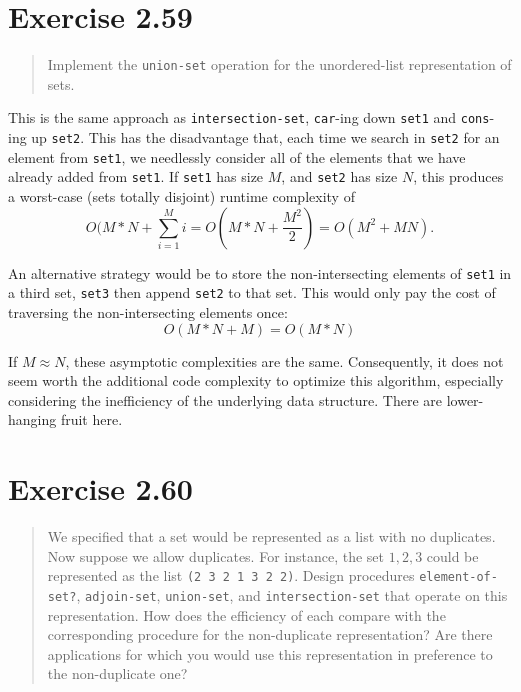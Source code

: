 \documentclass{article}
\begin{document}
\section{Exercise 2.59}
\begin{quote}
    Implement the \texttt{union-set} operation for the unordered-list
    representation of sets.
\end{quote}



This is the same approach as \texttt{intersection-set}, \texttt{car}-ing down
\texttt{set1} and \texttt{cons}-ing up \texttt{set2}. This has the disadvantage
that, each time we search in \texttt{set2} for an element from \texttt{set1},
we needlessly consider all of the elements that we have already added from
\texttt{set1}. If \texttt{set1} has size $M$, and \texttt{set2} has size $N$,
this produces a worst-case (sets totally disjoint) runtime complexity of
\begin{equation*}
    O(M * N + \sum_{i=1}^{M}i = O(M * N + \frac{M^2}{2}) = O(M^2 + MN).
\end{equation*}

An alternative strategy would be to store the non-intersecting elements of
\texttt{set1} in a third set, \texttt{set3} then append \texttt{set2} to that
set. This would only pay the cost of traversing the non-intersecting elements
once:
\begin{equation*}
    O(M * N + M) = O(M *N)
\end{equation*}

If $M \approx N$, these asymptotic complexities are the same. Consequently, it
does not seem worth the additional code complexity to optimize this algorithm,
especially considering the inefficiency of the underlying data structure. There
are lower-hanging fruit here.

\section{Exercise 2.60}
\begin{quote}
    We specified that a set would be represented as a list with no duplicates.
    Now suppose we allow duplicates. For instance, the set ${1,2,3}$ could
    be represented as the list \texttt{(2 3 2 1 3 2 2)}. Design procedures
    \texttt{element-of-set?}, \texttt{adjoin-set}, \texttt{union-set}, and
    \texttt{intersection-set} that operate
    on this representation. How does the efficiency of each compare with the
    corresponding procedure for the non-duplicate representation? Are there
    applications for which you would use this representation in preference to
    the non-duplicate one?
\end{quote}
\end{document}
